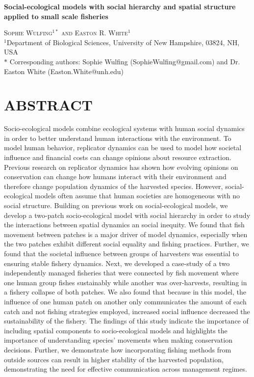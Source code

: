 \documentclass[
  12pt,
]{article}
\author{}
\date{\vspace{-2.5em}}
\begin{document}
\doublespacing

\begin{center}
    
\textbf{\Large Social-ecological models with social hierarchy and spatial structure applied to small scale fisheries}
    
\textsc{Sophie Wulfing$^{1*}$ and Easton R. White$^{1}$\\}
\vspace{3 mm}
\normalsize{\indent $^1$Department of Biological Sciences, University of New Hampshire, 03824, NH, USA\\}
$\text{*}$ Corresponding authors: Sophie Wulfing (SophieWulfing@gmail.com) and Dr. Easton White (Easton.White@unh.edu)
\end{center}

\newpage

\linenumbers

\section{ABSTRACT}\label{abstract}

Socio-ecological models combine ecological systems with human social dynamics in order to better understand human interactions with the environment. To model human behavior, replicator dynamics can be used to model how societal influence and financial costs can change opinions about resource extraction. Previous research on replicator dynamics has shown how evolving opinions on conservation can change how humans interact with their environment and therefore change population dynamics of the harvested species. However, social-ecological models often assume that human societies are homogeneous with no social structure. Building on previous work on social-ecological models, we develop a two-patch socio-ecological model with social hierarchy in order to study the interactions between spatial dynamics an social inequity. We found that fish movement between patches is a major driver of model dynamics, especially when the two patches exhibit different social equality and fishing practices. Further, we found that the societal influence between groups of harvesters was essential to ensuring stable fishery dynamics. Next, we developed a case-study of a two independently managed fisheries that were connected by fish movement where one human group fishes sustainably while another was over-harvests, resulting in a fishery collapse of both patches. We also found that because in this model, the influence of one human patch on another only communicates the amount of each catch and not fishing strategies employed, increased social influence decreased the sustainability of the fishery. The findings of this study indicate the importance of including spatial components to socio-ecological models and highlights the importance of understanding species' movements when making conservation decisions. Further, we demonstrate how incorporating fishing methods from outside sources can result in higher stability of the harvested population, demonstrating the need for effective communication across management regimes.
\end{document}

